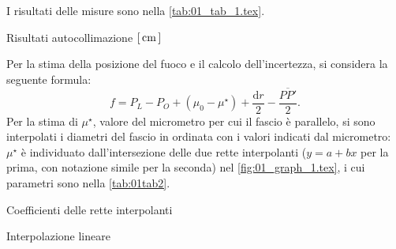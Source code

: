 

I risultati delle misure sono nella \autoref{tab:01_tab_1.tex}.
\begin{tabella}
	\centering
	
	\caption{Risultati autocollimazione $[\,\mathrm{cm}\,]$}
	\label{tab:01_tab_1.tex}
\end{tabella}
Per la stima della posizione del fuoco e il calcolo dell'incertezza, si considera la seguente formula:
\begin{equation} 
f = P_L - P_O + \left(\mu _0 - \mu ^{\star}\right) + \frac{\mathrm{d}r}{2} - \frac{\overline{PP'}}{2}.
\end{equation}
Per la stima di $ \mu ^{\star} $, valore del micrometro per cui il fascio \`e parallelo, si sono interpolati i diametri del fascio in ordinata con i valori indicati dal micrometro: $ \mu ^{\star}$ \`e individuato dall'intersezione delle due rette interpolanti ($y=a+bx$ per la prima, con notazione simile per la seconda) nel \autoref{fig:01_graph_1.tex}, i cui parametri sono nella \autoref{tab:01tab2}.
\begin{tabella}
	\centering
	
	\caption{Coefficienti delle rette interpolanti}
	\label{tab:01tab2}
\end{tabella}

\begin{grafico} \centering  \caption{Interpolazione lineare} \label{fig:01_graph_1.tex} \end{grafico}

